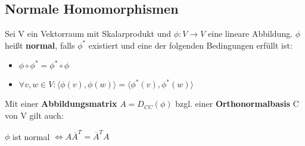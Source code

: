 \documentclass[10pt,a4paper]{article}
\begin{document}
	\subsection{Normale Homomorphismen}
	\label{aa:sub:normale_homomorphismen}

	Sei V ein Vektorraum mit Skalarprodukt und $\phi: V \rightarrow V$ eine lineare Abbildung. $\phi$ heißt \textbf{normal}, falls $\phi^*$ existiert und eine der folgenden Bedingungen erfüllt ist:
	\begin{itemize}
		\item $\phi \circ \phi^* = \phi^* \circ \phi$
		\item $\forall v,w \in V: \langle \phi(v), \phi(w)\rangle = \langle \phi^*(v), \phi^*(w)\rangle$
	\end{itemize}
	Mit einer \textbf{Abbildungsmatrix} $A = D_{CC}(\phi)$ bzgl. einer \textbf{Orthonormalbasis} C von V gilt auch:
	\begin{center}
		$\phi$ ist normal $\Leftrightarrow A \overline{A}^T = \overline{A}^TA$
	\end{center}
\end{document}

